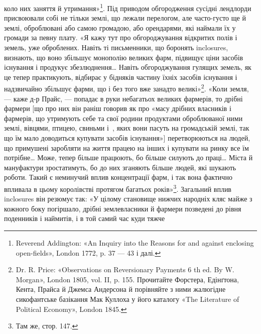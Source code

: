 \parcont{}  %
коло них заняття й утримання»\footnote{
Reverend Addington: «An Inquiry into the Reasons for and against
enclosing open-fields», London 1772, p. 37 — 43 і далі.
}. Під приводом обгородження
сусідні лендлорди присвоювали собі не тільки землі, що лежали
перелогом, але часто-густо ще й землі, оброблювані або самою
громадою, або орендарями, які наймали їх у громади за певну
плату. «Я кажу тут про обгороджування відкритих полів і земель,
уже оброблених. Навіть ті письменники, що боронять
inclosures, визнають, що воно збільшує монополію великих
фарм, підвищує ціни засобів існування і продукує збезлюднення\dots{}
Навіть обгороджування гулящих земель, як це тепер практикують,
відбирає у бідняків частину їхніх засобів існування і надзвичайно
збільшує фарми, що і без того вже занадто великі»\footnote{
Dr. R. Price: «Observations on Reversionary Payments 6 th ed.
By W. Morgan», London 1805, vol. II, p. 155. Прочитайте Форстера,
Едінґтона, Кента, Прайса й Джемса Андерсона й порівняйте з ними жалюгідне
сикофантське базікання Мак Куллоха у його каталогу «The
Literature of Political Economy», London 1845.
}.
«Коли земля, — каже д-р Прайс, — попадає в руки небагатьох
великих фармерів, то дрібні фармери [що про них він раніш говорив
як про «масу дрібних власників і фармерів, що утримують
себе та свої родини продуктами оброблюваної ними землі, вівцями,
птицею, свиньми і~, яких вони пасуть на громадській
землі, так що їм мало доводиться купувати засобів існування»]
перетворюються на людей, що примушені заробляти на життя
працею на інших і купувати на ринку все їм потрібне\dots{} Може,
тепер більше працюють, бо більше силують до праці\dots{} Міста й
мануфактури зростатимуть, бо до них зганяють більше людей,
які шукають роботи. Такий є неминучий вплив концентрації
фарм, і так вона фактично впливала в цьому королівстві протягом
багатьох років»\footnote{
Там же, стор. 147.
}. Загальний вплив inclosures він резюмує
так: «У цілому становище нижчих народніх кляс майже з
кожного боку погіршало, дрібні землевласники й фармери позведені
до рівня поденників і наймитів, і в той самий час куди тяжче
